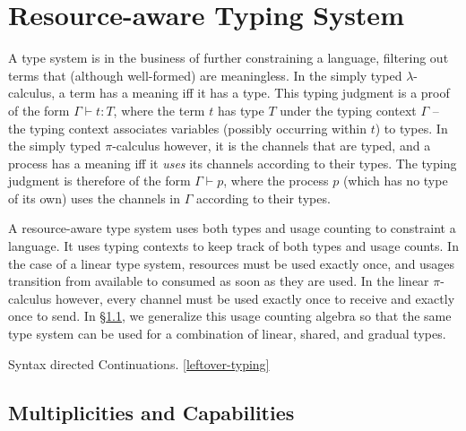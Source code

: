 \documentclass[a4paper,UKenglish,cleveref, autoref, thm-restate,authorcolumns]{lipics-v2019}
\theoremstyle{definition}
\newcommand{\lamdacalc}{$\lambda$-calculus}
\newcommand{\picalc}{$\pi$-calculus}
\begin{document}
\section{Resource-aware Typing System}

A type system is in the business of further constraining a language, filtering out terms that (although well-formed) are meaningless.
In the simply typed \lamdacalc{}, a term has a meaning iff it has a type.
This typing judgment is a proof of the form $\Gamma \vdash t : T$, where the term $t$ has type $T$ under the typing context $\Gamma$ -- the typing context associates variables (possibly occurring within $t$) to types.
In the simply typed \picalc{} however, it is the channels that are typed, and a process has a meaning iff it \emph{uses} its channels according to their types.
The typing judgment is therefore of the form $\Gamma \vdash p$, where the process $p$ (which has no type of its own) uses the channels in $\Gamma$ according to their types.

A resource-aware type system uses both types and usage counting to constraint a language.
It uses typing contexts to keep track of both types and usage counts.
In the case of a linear type system, resources must be used exactly once, and usages transition from available to consumed as soon as they are used.
In the linear \picalc{} however, every channel must be used exactly once to receive and exactly once to send.
In \S \ref{multiplicities}, we generalize this usage counting algebra so that the same type system can be used for a combination of linear, shared, and gradual types.


Syntax directed
Continuations.
\ref{leftover-typing}

\subsection{Multiplicities and Capabilities}\label{multiplicities}
\end{document}

